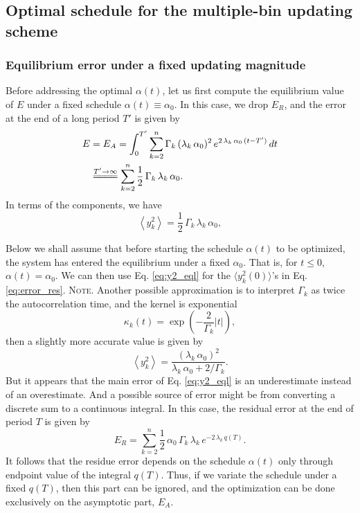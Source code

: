 \documentclass[reprint, floatfix]{revtex4-1}
\newcommand{\note}[1]{{\color{DarkGreen}\footnotesize \textsc{Note.} #1}}
\newcommand{\Err}{E}
\begin{document}
\subsection{\label{sec:mbin_opta}
Optimal schedule for the multiple-bin updating scheme}



\subsubsection{\label{eq:eqlerr}
Equilibrium error under a fixed updating magnitude
}


Before addressing the optimal $\alpha(t)$,
let us first compute the equilibrium value of $\Err$
under a fixed schedule $\alpha(t) \equiv \alpha_0$.
%
In this case, we drop $\Err_R$, and
the error at the end of a long period $T'$
is given by
%
\begin{align}
  \Err
  &=
  \Err_A
  =
  \int_0^{T'}
    \sum_{k = 2}^n
      \Gamma_k \, (\lambda_k \, \alpha_0)^2 \,
      e^{ 2 \, \lambda_k \, \alpha_0 \, (t - T') }
    \, dt
  \notag
  \\
  &
  \stackrel{ T' \to \infty }
  { =\joinrel=\joinrel=\joinrel= }
  \sum_{ k = 2 }^n
    \frac 1 2 \, \Gamma_k \, \lambda_k \, \alpha_0.
  \label{eq:error_eql}
\end{align}
%
In terms of the components, we have
%
\begin{equation}
  \left\langle
    y_k^2
  \right\rangle
  =
  \frac 1 2 \, \Gamma_k \, \lambda_k \, \alpha_0,
  \label{eq:y2_eql}
\end{equation}
%

Below we shall assume that before starting
the schedule $\alpha(t)$ to be optimized,
the system has entered the equilibrium
under a fixed $\alpha_0$.
%
That is, for $t \le 0$,
$\alpha(t) = \alpha_0$.
%
We can then use Eq. \eqref{eq:y2_eql}
for the $\langle y_k^2(0) \rangle$'s in Eq. \eqref{eq:error_res}.
%
\note{Another possible approximation
  is to interpret $\Gamma_k$ as twice the autocorrelation time,
  and the kernel is exponential
  $$
  \kappa_k(t) = \exp\left( - \frac{2}{\Gamma_k} |t| \right),
  $$
  then a slightly more accurate value is given by\cite{vankampen}
  $$
  \left\langle
    y_k^2
  \right\rangle
  =
  \frac{      ( \lambda_k \, \alpha_0 )^2     }
       { \lambda_k \, \alpha_0 + 2 / \Gamma_k }.
  $$
  But it appears that the main error of Eq. \eqref{eq:y2_eql}
  is an underestimate instead of an overestimate.
  And a possible source of error might be from
  converting a discrete sum to a continuous integral.
}
%
In this case,
the residual error at the end of period $T$
is given by
%
\begin{equation}
  \Err_R
  =
  \sum_{k = 2}^n
      \frac 1 2 \, \alpha_0 \, \Gamma_k \, \lambda_k \,
      e^{  - 2 \, \lambda_k \, q(T) }
  .
  \label{eq:error_res1}
\end{equation}
%
It follows that the residue error
depends on the schedule $\alpha(t)$
only through endpoint value of
the integral $q(T)$.
%
Thus, if we variate the schedule under a fixed $q(T)$,
then this part can be ignored,
and the optimization can be done exclusively
on the asymptotic part, $\Err_A$.
\end{document}
